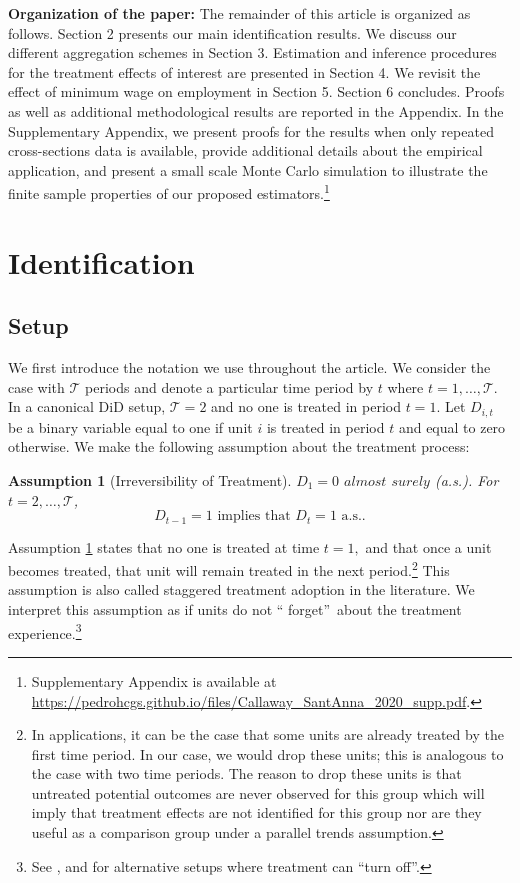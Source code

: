 \documentclass[11pt]{article}%
\theoremstyle{plain}
\newtheorem{assumption}{Assumption}
\numberwithin{sassumption}{section}
\numberwithin{equation}{section}
\begin{document}
\textbf{Organization of the paper: }The remainder of this article is organized
as follows. Section 2 presents our main identification results. We discuss our
different aggregation schemes in Section 3. Estimation and inference
procedures for the treatment effects of interest are presented in Section 4.
We revisit the effect of minimum wage on employment in Section 5. Section 6
concludes. Proofs as well as additional methodological results are reported in
the Appendix. In the Supplementary Appendix, we present proofs for the results when only repeated cross-sections data is available, provide additional details about the empirical application, and present a small scale Monte Carlo simulation to illustrate the finite sample properties of our proposed estimators.\footnote{Supplementary Appendix is available at \url{https://pedrohcgs.github.io/files/Callaway_SantAnna_2020_supp.pdf}.}

\section{Identification\label{sec:2}}

\subsection{Setup}

We first introduce the notation we use throughout the article. We consider the
case with $\mathcal{T}$ periods and denote a particular time period by $t$
where $t=1,\ldots,\mathcal{T}$. In a canonical DiD setup, $\mathcal{T}=2$ and
no one is treated in period $t=1$. Let $D_{i,t}$ be a binary variable equal to
one if unit $i$ is treated in period $t$ and equal to zero otherwise. We make
the following assumption about the treatment process:

\begin{assumption}
[Irreversibility of Treatment]\label{ass:irrev} $D_{1}=0$ $almost$ $surely$
(a.s.). For $t=2,\ldots,\mathcal{T}$,
\[
D_{t-1}=1\text{ implies that }D_{t}=1\text{ a.s..}%
\]

\end{assumption}

Assumption \ref{ass:irrev} states that no one is treated at time $t=1,$ and
that once a unit becomes treated, that unit will remain treated in the next
period.\footnote{{In applications, it can be the case that some units are
already treated by the first time period. In our case, we would drop these
units; this is analogous to the case with two time periods. The reason to drop
these units is that untreated potential outcomes are never observed for this
group which will imply that treatment effects are not identified for this group nor 
are they useful as a comparison group under a parallel trends assumption.}}
This assumption is also called staggered treatment adoption in the literature.
We interpret this assumption as if units do not \textquotedblleft
forget\textquotedblright\ about the treatment experience.\footnote{See
\cite{Han2019}, \cite{DeChaisemartin2016} and \cite{Bojinov2020} for
alternative setups where treatment can \textquotedblleft turn
off\textquotedblright.}
\end{document}
